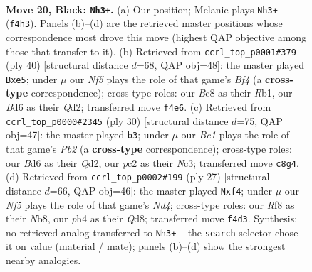 \documentclass[11pt]{article}
\begin{document}
\clearpage

\begin{figure}[p]\centering
\begin{subfigure}{0.46\textwidth}\centering
\resizebox{\linewidth}{!}{%
\newchessgame
\chessboard[
  setfen={r1bq1rk1/pp5p/3b1pp1/3p4/5n1P/1B1P1NP1/PPPB1P2/R2QR1K1 b - - 0 20},
  showmover=false,
  pgfstyle=straightmove, color=movearrow, markmove={f4-h3}
]}
\caption{}
\end{subfigure}\hfill
\begin{subfigure}{0.46\textwidth}\centering
\resizebox{\linewidth}{!}{%
\newchessgame
\chessboard[
  setfen={2rqr1k1/1b1n1p1p/p2p2p1/2p1b3/2P1PB2/PPN2B2/3Q2PP/1R3RK1 w - - 2 21},
  showmover=false,
  pgfstyle=straightmove, color=movearrow, markmove={f4-e5}
]}
\caption{}
\end{subfigure}
\\[4pt]
\begin{subfigure}{0.46\textwidth}\centering
\resizebox{\linewidth}{!}{%
\newchessgame
\chessboard[
  setfen={2rq1rk1/1p1npp1p/p1bp2p1/P3b3/3BP3/2N3PP/1PPQ1PB1/R2R2K1 w - - 1 16},
  showmover=false,
  pgfstyle=straightmove, color=movearrow, markmove={b2-b3}
]}
\caption{}
\end{subfigure}\hfill
\begin{subfigure}{0.46\textwidth}\centering
\resizebox{\linewidth}{!}{%
\newchessgame
\chessboard[
  setfen={rnbq1rk1/pp2b1pp/2p5/3n1p2/3P1N2/2N2PPB/PP5P/R1BQ1RK1 b - - 1 14},
  showmover=false,
  pgfstyle=straightmove, color=movearrow, markmove={d5-f4}
]}
\caption{}
\end{subfigure}
\caption{\textbf{Move 20, Black: \texttt{Nh3+}.} (a) Our position; Melanie plays \texttt{Nh3+} (\texttt{f4h3}). Panels (b)--(d) are the retrieved master positions whose correspondence most drove this move (highest QAP objective among those that transfer to it). (b) Retrieved from \texttt{ccrl\_top\_p0001\#379} (ply 40) [structural distance $d$=68, QAP obj=48]: the master played \texttt{Bxe5}; under $\mu$ our \emph{Nf5} plays the role of that game's \emph{Bf4} (a \textbf{cross-type} correspondence); cross-type roles: our \emph{B}c8 as their \emph{R}b1, our \emph{B}d6 as their \emph{Q}d2; transferred move \texttt{f4e6}. (c) Retrieved from \texttt{ccrl\_top\_p0000\#2345} (ply 30) [structural distance $d$=75, QAP obj=47]: the master played \texttt{b3}; under $\mu$ our \emph{Bc1} plays the role of that game's \emph{Pb2} (a \textbf{cross-type} correspondence); cross-type roles: our \emph{B}d6 as their \emph{Q}d2, our \emph{p}c2 as their \emph{N}c3; transferred move \texttt{c8g4}. (d) Retrieved from \texttt{ccrl\_top\_p0002\#199} (ply 27) [structural distance $d$=66, QAP obj=46]: the master played \texttt{Nxf4}; under $\mu$ our \emph{Nf5} plays the role of that game's \emph{Nd4}; cross-type roles: our \emph{R}f8 as their \emph{N}b8, our \emph{p}h4 as their \emph{Q}d8; transferred move \texttt{f4d3}. Synthesis: no retrieved analog transferred to \texttt{Nh3+} -- the \texttt{search} selector chose it on value (material / mate); panels (b)--(d) show the strongest nearby analogies.}
\label{fig:thought-m39}
\end{figure}
\end{document}
